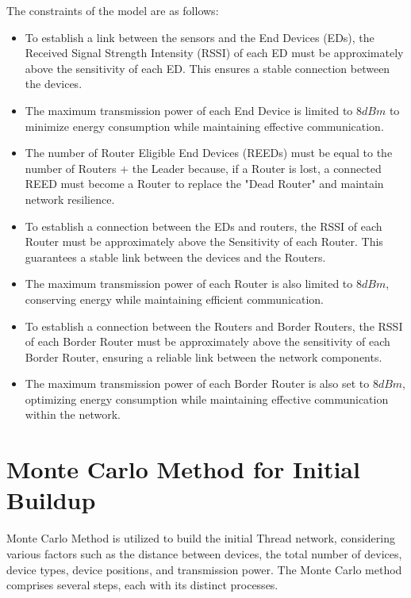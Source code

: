 The constraints of the model are as follows:

\vspace{2mm}
\begin{itemize}
    \item To establish a link between the sensors and the End Devices (EDs), the Received Signal Strength Intensity (RSSI) of each ED must be approximately above the sensitivity of each ED. This ensures a stable connection between the devices.
    \item The maximum transmission power of each End Device is limited to $8 dBm$ to minimize energy consumption while maintaining effective communication.
    \item The number of Router Eligible End Devices (REEDs) must be equal to the number of Routers + the Leader because, if a Router is lost, a connected REED must become a Router to replace the "Dead Router" and maintain network resilience.
    \item To establish a connection between the EDs and routers, the RSSI of each Router must be approximately above the Sensitivity of each Router. This guarantees a stable link between the devices and the Routers.
    \item The maximum transmission power of each Router is also limited to $8 dBm$, conserving energy while maintaining efficient communication.
    \item To establish a connection between the Routers and Border Routers, the RSSI of each Border Router must be approximately above the sensitivity of each Border Router, ensuring a reliable link between the network components.
    \item The maximum transmission power of each Border Router is also set to $8 dBm$, optimizing energy consumption while maintaining effective communication within the network.
\end{itemize}
\vspace{3mm}


\section{Monte Carlo Method for Initial Buildup}\label{sec:monte_carlo_method}
Monte Carlo Method is utilized to build the initial Thread network, considering various factors such as the distance between devices, the total number of devices, device types, device positions, and transmission power. The Monte Carlo method comprises several steps, each with its distinct processes.

